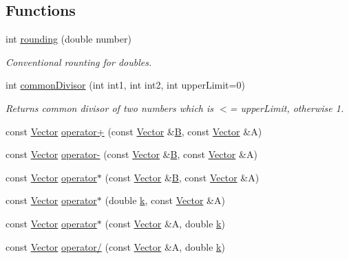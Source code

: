 \subsection*{Functions}
\begin{DoxyCompactItemize}
\item 
int \hyperlink{namespace_p_c_a_acd05fa0d440ac1781a76499f3cdb3f38}{rounding} (double number)
\begin{DoxyCompactList}\small\item\em Conventional rounting for doubles. \end{DoxyCompactList}\item 
int \hyperlink{namespace_p_c_a_a13d2c7cbde32faf05da77e81c6396b92}{common\+Divisor} (int int1, int int2, int upper\+Limit=0)
\begin{DoxyCompactList}\small\item\em Returns common divisor of two numbers which is $<$= upper\+Limit, otherwise 1. \end{DoxyCompactList}\item 
const \hyperlink{class_p_c_a_1_1_vector}{Vector} \hyperlink{namespace_p_c_a_a017b6648f950fd5e297bc92225a425dc}{operator+} (const \hyperlink{class_p_c_a_1_1_vector}{Vector} \&\hyperlink{scaling_picture__new_8m_a9d3d9048db16a7eee539e93e3618cbe7}{B}, const \hyperlink{class_p_c_a_1_1_vector}{Vector} \&A)
\item 
const \hyperlink{class_p_c_a_1_1_vector}{Vector} \hyperlink{namespace_p_c_a_a430437e74079b33bcf7a99ef38c01134}{operator-\/} (const \hyperlink{class_p_c_a_1_1_vector}{Vector} \&\hyperlink{scaling_picture__new_8m_a9d3d9048db16a7eee539e93e3618cbe7}{B}, const \hyperlink{class_p_c_a_1_1_vector}{Vector} \&A)
\item 
const \hyperlink{class_p_c_a_1_1_vector}{Vector} \hyperlink{namespace_p_c_a_a49f60e2a8814942d40f8df470c723214}{operator$\ast$} (const \hyperlink{class_p_c_a_1_1_vector}{Vector} \&\hyperlink{scaling_picture__new_8m_a9d3d9048db16a7eee539e93e3618cbe7}{B}, const \hyperlink{class_p_c_a_1_1_vector}{Vector} \&A)
\item 
const \hyperlink{class_p_c_a_1_1_vector}{Vector} \hyperlink{namespace_p_c_a_a6f1801f8e53ab87a1f3175ec18fa3115}{operator$\ast$} (double \hyperlink{scaling_picture__new_8m_af37276f15d333b0ba4bf3487cdae4c0d}{k}, const \hyperlink{class_p_c_a_1_1_vector}{Vector} \&A)
\item 
const \hyperlink{class_p_c_a_1_1_vector}{Vector} \hyperlink{namespace_p_c_a_a58012056e60671ce13c8318b3cd1ec8f}{operator$\ast$} (const \hyperlink{class_p_c_a_1_1_vector}{Vector} \&A, double \hyperlink{scaling_picture__new_8m_af37276f15d333b0ba4bf3487cdae4c0d}{k})
\item 
const \hyperlink{class_p_c_a_1_1_vector}{Vector} \hyperlink{namespace_p_c_a_a5144cc8f2a3d8ab924e8c4c1c32a2aed}{operator/} (const \hyperlink{class_p_c_a_1_1_vector}{Vector} \&A, double \hyperlink{scaling_picture__new_8m_af37276f15d333b0ba4bf3487cdae4c0d}{k})
\end{DoxyCompactItemize}
